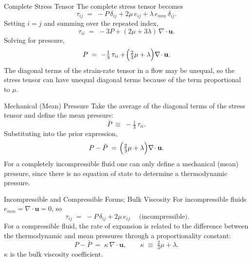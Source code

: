 \documentclass[10pt,aspectratio=43]{beamer}
\newcommand{\bu}{\mathbf{u}}
\newcommand{\divg}{\nabla\!\cdot}
\begin{document}
\begin{frame}{Complete Stress Tensor}
  The complete stress tensor becomes
  \[
    \tau_{ij} \;=\; -P\,\delta_{ij} + 2\mu\,e_{ij} + \lambda\,e_{mm}\,\delta_{ij}.
  \]
  Setting $i=j$ and summing over the repeated index,
  \[
    \tau_{ii} \;=\; -3P + (2\mu + 3\lambda)\,\divg\bu.
  \]
  Solving for pressure,
  \[
    P \;=\; -\tfrac{1}{3}\,\tau_{ii} + \!\Bigl(\tfrac{2}{3}\mu + \lambda\Bigr)\divg\bu.
  \]
  The diagonal terms of the strain-rate tensor in a flow may be unequal,
  so the stress tensor can have unequal diagonal terms because of the term
  proportional to $\mu$.
\end{frame}

\begin{frame}{Mechanical (Mean) Pressure}
  Take the average of the diagonal terms of the stress tensor and define
  the \alert{mean pressure}:
  \[
    \bar{P} \;\equiv\; -\tfrac{1}{3}\,\tau_{ii}.
  \]
  Substituting into the prior expression,
  \[
    P - \bar{P} \;=\; \!\Bigl(\tfrac{2}{3}\mu + \lambda\Bigr)\divg\bu.
  \]
  For a completely incompressible fluid one can only define a mechanical
  (mean) pressure, since there is no equation of state to determine a
  thermodynamic pressure.
\end{frame}

\begin{frame}{Incompressible and Compressible Forms; Bulk Viscosity}
  For incompressible fluids $e_{mm}=\divg\bu=0$, so
  \[
    \boxed{\;\tau_{ij} \;=\; -P\,\delta_{ij} + 2\mu\,e_{ij}\;}
    \quad\text{(incompressible)}.
  \]
  For a compressible fluid, the rate of expansion is related to the
  difference between the thermodynamic and mean pressures through a
  proportionality constant:
  \[
    P - \bar{P} \;=\; \kappa\,\divg\bu,
    \qquad
    \kappa \;\equiv\; \tfrac{2}{3}\mu + \lambda.
  \]
  $\kappa$ is the \alert{bulk viscosity coefficient}.
\end{frame}
\end{document}
